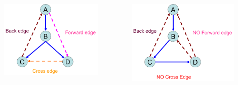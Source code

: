 \begin{frame}{}
  \begin{columns}
      \includegraphics[width = 0.80\textwidth]{figs/dfs-digraph.png}

      \vspace{0.50cm}
      \centerline{}
    \pause
      \includegraphics[width = 0.80\textwidth]{figs/dfs-undirected.png}

      \vspace{0.50cm}
      \centerline{}
  \end{columns}
\end{frame}

